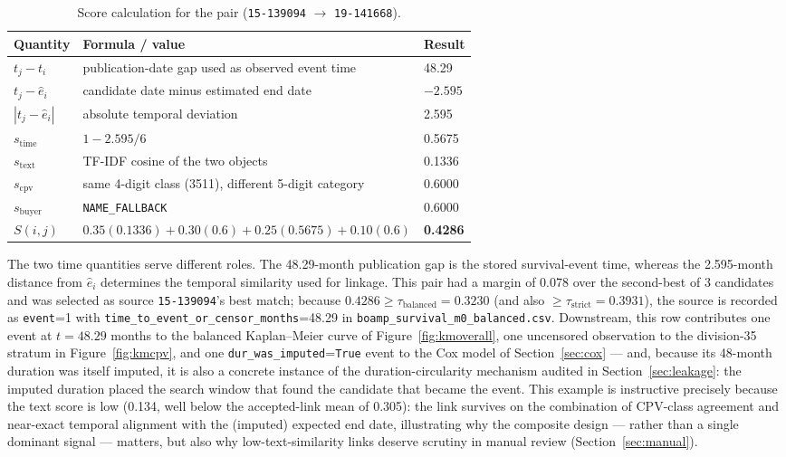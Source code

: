 \documentclass[11pt]{article}
\begin{document}
\begin{table}[h!]
\centering
\caption{Score calculation for the pair (\texttt{15-139094} $\rightarrow$
\texttt{19-141668}).}
\begin{tabular}{lll}
\toprule
Quantity & Formula / value & Result \\
\midrule
$t_j-t_i$ & publication-date gap used as observed event time & 48.29 \\
$t_j-\hat e_i$ & candidate date minus estimated end date & $-2.595$ \\
$|t_j-\hat e_i|$ & absolute temporal deviation & 2.595 \\
$s_{\text{time}}$ & $1-2.595/6$ & 0.5675 \\
$s_{\text{text}}$ & TF-IDF cosine of the two objects & 0.1336 \\
$s_{\text{cpv}}$ & same 4-digit class (3511), different 5-digit category & 0.6000 \\
$s_{\text{buyer}}$ & \texttt{NAME\_FALLBACK} & 0.6000 \\
$S(i,j)$ & $0.35(0.1336)+0.30(0.6)+0.25(0.5675)+0.10(0.6)$ & \textbf{0.4286} \\
\bottomrule
\end{tabular}
\end{table}
The two time quantities serve different roles. The 48.29-month publication
gap is the stored survival-event time, whereas the 2.595-month distance from
$\hat e_i$ determines the temporal similarity used for linkage.
This pair had a margin of 0.078 over the second-best of 3 candidates and
was selected as source \texttt{15-139094}'s best match; because
$0.4286 \geq \tau_{\text{balanced}}=0.3230$ (and also $\geq
\tau_{\text{strict}}=0.3931$), the source is recorded as \texttt{event}=1
with \texttt{time\_to\_event\_or\_censor\_months}=48.29 in
\texttt{boamp\_survival\_m0\_balanced.csv}. Downstream, this row
contributes one event at $t=48.29$ months to the balanced Kaplan--Meier
curve of Figure~\ref{fig:kmoverall}, one uncensored observation to the
division-35 stratum in Figure~\ref{fig:kmcpv}, and one
\texttt{dur\_was\_imputed}=\texttt{True} event to the Cox model of
Section~\ref{sec:cox} --- and, because its 48-month duration was itself
imputed, it is also a concrete instance of the duration-circularity
mechanism audited in Section~\ref{sec:leakage}: the imputed duration
placed the search window that found the candidate that became the event.
This example is instructive precisely because the text score is low
(0.134, well below the accepted-link mean of 0.305): the link survives on
the combination of CPV-class agreement and near-exact temporal alignment
with the (imputed) expected end date, illustrating why the composite
design --- rather than a single dominant signal --- matters, but also why
low-text-similarity links deserve scrutiny in manual review
(Section~\ref{sec:manual}).
\end{document}

